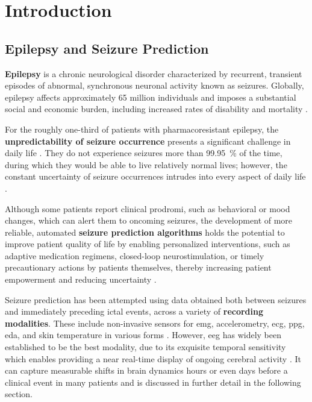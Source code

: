 \chapter{Introduction}\label{ch:introduction}



\section{Epilepsy and Seizure Prediction}
\textbf{Epilepsy} is a chronic neurological disorder characterized by recurrent, transient episodes of abnormal, synchronous neuronal activity known as seizures.
Globally, epilepsy affects approximately 65 million individuals and imposes a substantial social and economic burden, including increased rates of disability and mortality \parencite{leonardi_global_2002, feigin_global_2021}.

For the roughly one-third of patients with pharmacoresistant epilepsy, the \textbf{unpredictability of seizure occurrence} presents a significant challenge in daily life \parencite{schulze-bonhage_unpredictability_2008}.
They do not experience seizures more than \SI{99.95}{\percent} of the time, during which they would be able to live relatively normal lives; however, the constant uncertainty of seizure occurrences intrudes into every aspect of daily life \parencite{freestone_forward-looking_2017}.

Although some patients report clinical prodromi, such as behavioral or mood changes, which can alert them to oncoming seizures, the development of more reliable, automated \textbf{seizure prediction algorithms} holds the potential to improve patient quality of life by enabling personalized interventions, such as adaptive medication regimens, closed-loop neurostimulation, or timely precautionary actions by patients themselves, thereby increasing patient empowerment and reducing uncertainty \parencite{mormann_seizure_2007}.

Seizure prediction has been attempted using data obtained both between seizures and immediately preceding ictal events, across a variety of \textbf{recording modalities}.
These include non-invasive sensors for \gls{emg}, accelerometry, \gls{ecg}, \gls{ppg}, \gls{eda}, and skin temperature in various forms \parencite{brinkmann_seizure_2021, kalousios_ecg-based_2025}.
However, \gls{eeg} has widely been established to be the best modality, due to its exquisite temporal sensitivity which enables providing a near real-time display of ongoing cerebral activity \parencite{st_louis_electroencephalography_2016, freestone_forward-looking_2017}.
It can capture measurable shifts in brain dynamics hours or even days before a clinical event in many patients \parencite{cook_prediction_2013} and is discussed in further detail in the following section.



